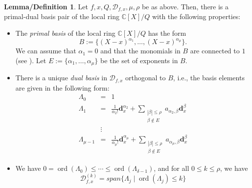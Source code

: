 \documentclass[12pt,oneside,reqno]{amsart}
\theoremstyle{definition}
\newtheorem{lemdef}[thm]{Lemma/Definition}
\DeclareMathOperator{\ord}{ord}
\begin{document}
\begin{lemdef}\cite[Lemma 4.1]{hauenstein2015certifying}
	Let $f,x,Q,\mathcal{D}_{f,x},\mu, \rho$ be as above. Then, there is a primal-dual basis pair of the local ring $\mathbb{C}[X]/Q$ with the following properties:
	\begin{itemize}
		\item The {\it primal basis} of the local ring $\mathbb{C}[X]/Q$ has the form
		\[B:=\{(X-x)^{\alpha_1},\dots, (X-x)^{\alpha_\mu}\}.\]
		We can assume that $\alpha_1=0$ and that the monomials in $B$ are connected to $1$ (see \cite{mourrain1999new}). Let $E:=\{\alpha_1,\dots, \alpha_\mu\}$ be the set of exponents in $B$.
		\item There is a unique {\it dual basis} in $\mathcal{D}_{f,x}$ orthogonal to $B$, i.e., the basis elements are given in the following form:
		\begin{eqnarray*}
		\Lambda_0 & = & 1\\
		\Lambda_1 & = & \frac{1}{\alpha_2!}\mathbf{d}_x^{\alpha_2}+\sum\limits_{\substack{|\beta|\leq \rho\\ \beta \notin E}}a_{\alpha_2,\beta}\mathbf{d}^\beta_x\\
		&\vdots &\\
		\Lambda_{\mu-1} & = & \frac{1}{\alpha_{\mu}!}\mathbf{d}_x^{\alpha_\mu}+\sum\limits_{\substack{|\beta|\leq \rho\\ \beta \notin E}}a_{\alpha_\mu,\beta}\mathbf{d}^\beta_x		
		\end{eqnarray*}
		\item We have $0=\ord(\Lambda_0)\leq \cdots \leq \ord(\Lambda_{\delta-1})$, and for all $0\leq k \leq \rho$, we have
		\[\mathcal{D}_{f,x}^{(k)}=span\{\Lambda_j\mid \ord(\Lambda_j)\leq k\}\]
	\end{itemize}
\end{lemdef}

\end{document}
